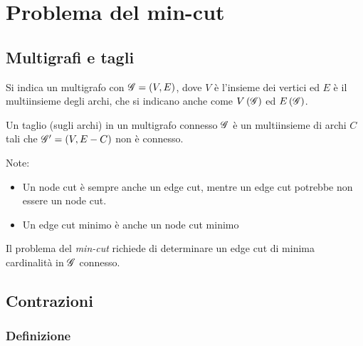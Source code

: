 \section{Problema del min-cut}

\subsection{Multigrafi e tagli}

Si indica un multigrafo con $
\mathscr{G}{}
=
\left( V, E \right)
$, dove $V$ è l'insieme dei vertici ed $E$ è il multiinsieme degli archi,
che si indicano anche come $
V \left( \mathscr{G}{} \right)
$ ed $
E \left( \mathscr{G}{} \right)
$.

\begin{definition}
    \label{def:edge_cut}
    Un taglio (sugli archi) in un multigrafo connesso $
    \mathscr{G}{}
    $ è un multiinsieme di archi $C$ tali che $
    \mathscr{G}{}' = \left( V, E-C \right)
    $ non è connesso.
\end{definition}
Note:
\begin{itemize}
    \item Un node cut è sempre anche un edge cut, mentre un edge cut potrebbe non essere un node cut.
    \item Un edge cut minimo è anche un node cut minimo
\end{itemize}

Il problema del \emph{min-cut} richiede di determinare un edge cut di minima cardinalità in $
\mathscr{G}{}
$ connesso.

\subsection{Contrazioni}

\subsubsection{Definizione}

